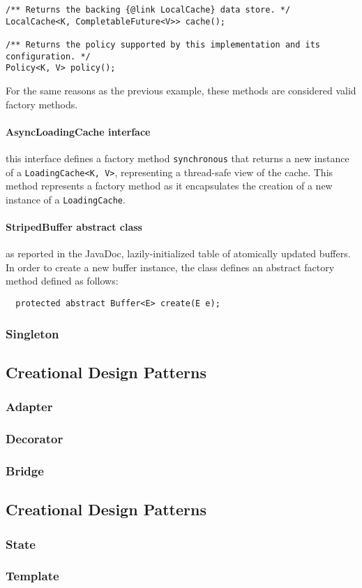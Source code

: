\begin{lstlisting}
/** Returns the backing {@link LocalCache} data store. */
LocalCache<K, CompletableFuture<V>> cache();

/** Returns the policy supported by this implementation and its configuration. */
Policy<K, V> policy();
\end{lstlisting}

\noindent For the same reasons as the previous example, these methods are considered valid factory methods.

\paragraph{AsyncLoadingCache interface} this interface defines a factory method \texttt{synchronous} that returns a new instance of a \texttt{LoadingCache<K, V>}, representing a thread-safe view of the cache. This method represents a factory method as it encapsulates the creation of a new instance of a \texttt{LoadingCache}.

\paragraph{StripedBuffer abstract class} as reported in the JavaDoc, lazily-initialized table of atomically updated buffers. In order to create a new buffer instance, the class defines an abstract factory method defined as follows:

\begin{lstlisting}
  protected abstract Buffer<E> create(E e);
\end{lstlisting}

\subsubsection{Singleton}

\subsection{Creational Design Patterns}

\subsubsection{Adapter}

\subsubsection{Decorator}

\subsubsection{Bridge}

\subsection{Creational Design Patterns}

\subsubsection{State}

\subsubsection{Template}

